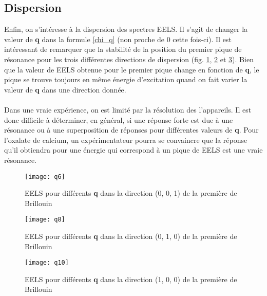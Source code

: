 \subsection{Dispersion}
Enfin, on s'intéresse à la dispersion des spectres EELS. 
Il s'agit de changer la valeur de \textbf{q} dans la formule \ref{chi_q} (non proche de 0 cette fois-ci).
Il est intéressant de remarquer que la stabilité de la position du premier pique de résonance pour les trois différentes directions de dispersion (fig. \ref{q6}, \ref{q8} et \ref{q10}).
Bien que la valeur de EELS obtenue pour le premier pique change en fonction de \textbf{q}, le pique se trouve toujours en même énergie d'excitation quand on fait varier la valeur de \textbf{q} dans une direction donnée. 
\\\\
Dans une vraie expérience, on est limité par la résolution des l'appareils.
Il est donc difficile à déterminer, en général, si une réponse forte est due à une résonance ou à une superposition de réponses pour différentes valeurs de \textbf{q}.
Pour l'oxalate de calcium, un expérimentateur pourra se convaincre que la réponse qu'il obtiendra pour une énergie qui correspond à un pique de EELS est une vraie résonance.


\begin{figure}[!h]\label{q6}
    \centering
    \texttt{[image: q6]}
    \caption{EELS pour différents \textbf{q} dans la direction (0, 0, 1) de la première de Brillouin}
\end{figure}

\begin{figure}[!h]\label{q8}
    \centering
    \texttt{[image: q8]}
    \caption{EELS pour différents \textbf{q} dans la direction (0, 1, 0) de la première de Brillouin}
\end{figure}
\begin{figure}[!h]\label{q10}
    \centering
    \texttt{[image: q10]}
    \caption{EELS pour différents \textbf{q} dans la direction (1, 0, 0) de la première de Brillouin}
\end{figure}